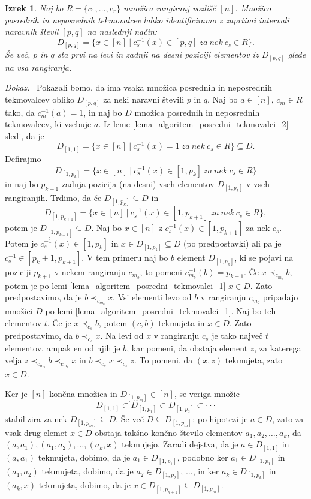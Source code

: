 \documentclass[a4paper, 12pt]{book}
\newtheorem{izrek}{Izrek}[chapter]
\newenvironment{dokaz}{\emph{Dokaz.}\ }{\hspace{\fill}{$\Box$}}
\begin{document}
\begin{izrek}
    Naj bo $R = \{ c_1, \dots, c_r \}$ množica rangiranj vozlišč $[n]$. Množico posrednih in neposrednih tekmovalcev lahko identificiramo z zaprtimi intervali naravnih števil $[p, q]$ na naslednji način: 
    \[
        D_{[p, q]} = \{ x \in [n] \ | \ c_s^{-1}(x) \in [p, q] \ za \ nek \ c_s \in R\}.
    \]
    Še več, $p$ in $q$ sta prvi na levi in zadnji na desni poziciji elementov iz $D_{[p, q]}$ glede na vsa rangiranja.
\end{izrek}
\begin{dokaz}
    Pokazali bomo, da ima vsaka množica posrednih in neposrednih tekmovalcev obliko $D_{[p, q]}$ za neki naravni števili $p$ in $q$. Naj bo $a \in [n]$, $c_m \in R$ tako, da $c_m^{-1}(a) = 1$, in naj bo $D$ množica posrednih in neposrednih tekmovalcev, ki vsebuje $a$. Iz leme \ref{lema_algoritem_posredni_tekmovalci_2} sledi, da je 
    \[ 
        D_{[1,1]} = \{ x \in [n] \ | \ c_s^{-1}(x) = 1 \ za \ nek \ c_s \in R \} \subseteq D.
    \] 
    Defirajmo 
    \[
        D_{[1, p_k]} = \{ x \in [n] \ | \ c_s^{-1}(x) \in [1, p_k] \ za \ nek \ c_s \in R\}
    \] 
    in naj bo $p_{k+1}$ zadnja pozicija (na desni) vseh elementov $D_{[1, p_k]}$ v vseh rangiranjih. Trdimo, da če $D_{[1, p_k]} \subseteq D$ in 
    \[
        D_{[1, p_{k+1}]} = \{ x \in [n] \ | \ c_s^{-1}(x) \in [1, p_{k+1}] \ za \ nek \ c_s \in R\},
    \] 
    potem je $D_{[1, p_{k+1}]} \subseteq D$. Naj bo $x \in [n]$ z $c_s^{-1}(x) \in [1, p_{k+1}]$ za nek $c_s$. Potem je $c_s^{-1}(x) \in [1, p_k]$ in $x \in D_{[1, p_k]} \subseteq D$ (po predpostavki) ali pa je $c_s^{-1} \in [p_k + 1, p_{k+1}]$. V tem primeru naj bo $b$ element $D_{[1,p_k]}$, ki se pojavi na poziciji $p_{k+1}$ v nekem rangiranju $c_{m_b}$, to pomeni $c_{m_b}^{-1}(b) = p_{k+1}$. Če $x \prec_{c_{m_b}} b$, potem je po lemi \ref{lema_algoritem_posredni_tekmovalci_1} $x \in D$. Zato predpostavimo, da je $b \prec_{c_{m_b}} x$. Vsi elementi levo od $b$ v rangiranju $c_{m_b}$ pripadajo množici $D$ po lemi \ref{lema_algoritem_posredni_tekmovalci_1}. Naj bo teh elementov $t$. Če je $x \prec_{c_s} b$, potem $(c, b)$ tekmujeta in $x \in D$. Zato predpostavimo, da $b \prec_{c_s} x$. Na levi od $x$ v rangiranju $c_s$ je tako največ $t$ elementov, ampak en od njih je $b$, kar pomeni, da obstaja element $z$, za katerega velja $z \prec_{c_{m_b}} b \prec_{c_{m_b}} x$ in $b \prec_{c_s} x \prec_{c_s} z$. To pomeni, da $(x, z)$ tekmujeta, zato $x \in D$.

    Ker je $[n]$ končna množica in $D_{[1, p_m]} \in [n]$, se veriga množic 
    \[
        D_{[1, 1]} \subset D_{[1, p_1]} \subset D_{[1, p_2]} \subset \cdot\cdot\cdot    
    \]
    stabilizira za nek $D_{[1, p_m]} \subseteq D$. Še več $D \subseteq D_{[1, p_m]}$: po hipotezi je $a \in D$, zato za vsak drug elemet $x \in D$ obstaja takšno končno število elementov $a_1, a_2, \dots, a_k$, da $(a, a_1),(a_1, a_2), \dots, (a_k, x)$ tekmujejo. Zaradi dejstva, da je $a \in D_{[1, 1]}$ in $(a, a_1)$ tekmujeta, dobimo, da je $a_1 \in D_{[1, p_1]}$, podobno ker $a_1 \in D_{[1, p_1]}$ in $(a_1, a_2)$ tekmujeta, dobimo, da je $a_2 \in D_{[1, p_2]}$, $\dots$, in ker $a_{k} \in D_{[1, p_k]}$ in $(a_k, x)$ tekmujeta, dobimo, da je $x \in D_{[1, p_{k+1}]} \subseteq D_{[1, p_m]}$.


\end{dokaz}
\end{document}
